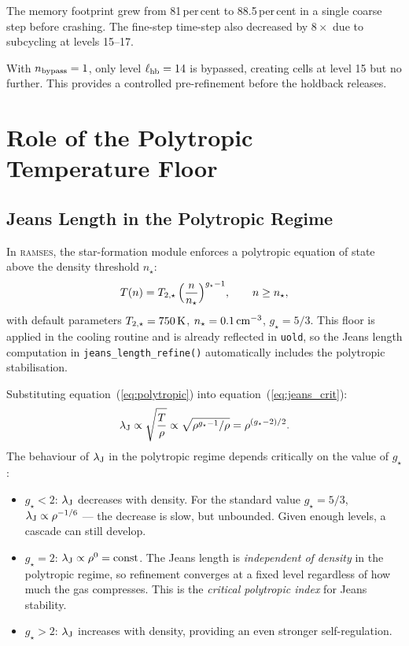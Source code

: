\documentclass[fleqn,usenatbib]{mnras}
\newcommand{\lJ}{\lambda_{\rm J}}
\newcommand{\nstar}{n_\star}
\newcommand{\Tstar}{T_{2,\star}}
\newcommand{\gstar}{g_\star}
\newcommand{\ramses}{\textsc{ramses}}
\newcommand{\code}[1]{\texttt{#1}}
\begin{document}
The memory footprint grew from 81\,per\,cent to 88.5\,per\,cent in a
single coarse step before crashing.  The fine-step time-step also
decreased by $8\times$ due to subcycling at levels 15--17.

With $n_{\rm bypass}=1$, only level $\ell_{\rm hb}=14$ is bypassed,
creating cells at level 15 but no further.  This provides a controlled
pre-refinement before the holdback releases.


\section{Role of the Polytropic Temperature Floor}
\label{sec:polytropic}

\subsection{Jeans Length in the Polytropic Regime}

In \ramses, the star-formation module enforces a polytropic equation
of state above the density threshold $\nstar$:
\begin{equation}
  T(n) = \Tstar\,\Bigl(\frac{n}{\nstar}\Bigr)^{\gstar - 1},
  \qquad n \ge \nstar,
  \label{eq:polytropic}
\end{equation}
with default parameters $\Tstar = 750\,{\rm K}$,
$\nstar = 0.1\,{\rm cm}^{-3}$, $\gstar = 5/3$.  This floor is
applied in the cooling routine and is already reflected in \code{uold},
so the Jeans length computation in \code{jeans\_length\_refine()}
automatically includes the polytropic stabilisation.

Substituting equation~(\ref{eq:polytropic}) into
equation~(\ref{eq:jeans_crit}):
\begin{equation}
  \lJ \propto \sqrt{\frac{T}{\rho}} \propto
  \sqrt{\rho^{\gstar-1}/\rho} = \rho^{(\gstar-2)/2}.
  \label{eq:jeans_poly}
\end{equation}
The behaviour of $\lJ$ in the polytropic regime depends critically
on the value of $\gstar$:

\begin{itemize}
  \item $\gstar < 2$: $\lJ$ decreases with density.  For the
    standard value $\gstar = 5/3$, $\lJ \propto \rho^{-1/6}$ ---
    the decrease is slow, but unbounded.  Given enough levels, a
    cascade can still develop.
  \item $\gstar = 2$: $\lJ \propto \rho^{0} = \mathrm{const}$.
    The Jeans length is \emph{independent of density} in the
    polytropic regime, so refinement converges at a fixed level
    regardless of how much the gas compresses.  This is the
    \emph{critical polytropic index} for Jeans stability.
  \item $\gstar > 2$: $\lJ$ increases with density, providing an
    even stronger self-regulation.
\end{itemize}
\end{document}
